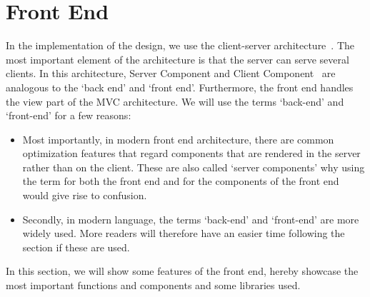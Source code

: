 \section{Front End}\label{sec:front-end}

In the implementation of the design, we use the client-server architecture~\cite{mathiassen2018}.
The most important element of the architecture is that the server can serve several clients.
In this architecture, Server Component and Client Component~\cite{mathiassen2018} are analogous to the `back end' and
`front end'.
Furthermore, the front end handles the view part of the MVC architecture.
We will use the terms `back-end' and `front-end' for a few reasons:

\begin{itemize}
    \item Most importantly, in modern front end architecture, there are common optimization features that regard
    components that are rendered in the server rather than on the client.
    These are also called `server components' why using the term for both the front end and for the components of the
    front end would give rise to confusion.

    \item Secondly, in modern language, the terms `back-end' and `front-end' are more widely used.
    More readers will therefore have an easier time following the section if these are used.
\end{itemize}

In this section, we will show some features of the front end, hereby showcase the most important functions and
components and some libraries used.





